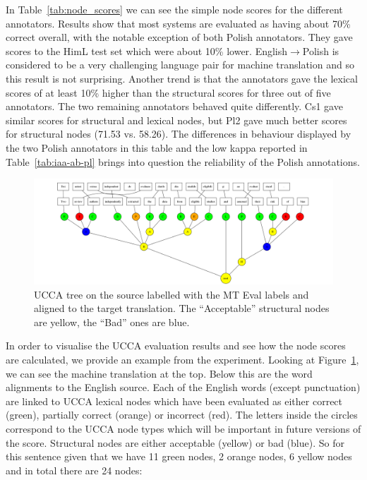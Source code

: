 \documentclass[11pt]{article}
\begin{document}
In Table~\ref{tab:node_scores} we can see the simple node scores for the different annotators. 
Results show that most systems are evaluated as having about 70\% correct overall, with the
notable exception of both Polish annotators. They gave scores to the HimL test set which
were about 10\% lower. English$\to$Polish is considered to be a very challenging language pair
for machine translation and so this result is not surprising.  Another trend is that the annotators gave the lexical scores of at least 
10\% higher than the structural scores for three out of five annotators. The two remaining
annotators behaved quite differently. Cs1 gave similar scores for structural and lexical nodes, but
Pl2 gave much better scores for structural nodes (71.53 vs. 58.26). 
The differences in behaviour displayed by the two Polish annotators in this table and the
low kappa reported in Table~\ref{tab:iaa-ab-pl}
brings into question the reliability of the Polish annotations.  


\begin{figure}[t]
    \includegraphics[width=1.1\textwidth]{tree_convert.png}
    \caption{UCCA tree on the source labelled with the MT Eval labels and aligned to the target translation. The 
    ``Acceptable'' structural nodes are yellow, the ``Bad'' ones are blue.}
    \label{fig:ucca-tree-evaluated}
\end{figure}

In order to visualise the UCCA evaluation results and see how the node scores are calculated, we provide an  example from the experiment. 
Looking at Figure~\ref{fig:ucca-tree-evaluated}, we can see the machine translation at the top. Below this are the word alignments to the English source. 
Each of the English words (except punctuation) are linked to UCCA lexical nodes which have been evaluated as either
correct (green), partially correct (orange) or incorrect (red). The letters inside the circles correspond to the UCCA node types
which will be important in future versions of the score. Structural nodes are either acceptable (yellow) or bad (blue). 
So for this sentence given that we have 11 green nodes, 2 orange nodes, 6 yellow nodes and in total there are 24 nodes:
\end{document}
